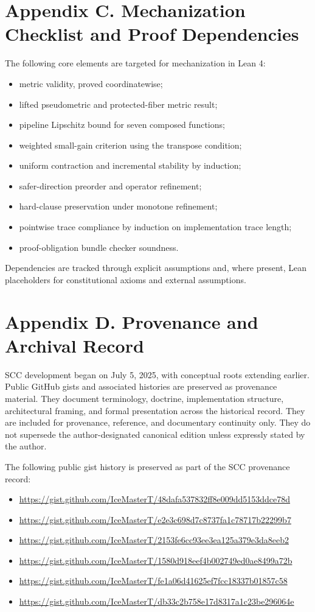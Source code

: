 \documentclass[10pt,oneside]{article}
\theoremstyle{definition}
\theoremstyle{remark}
\begin{document}
\section{Appendix C. Mechanization Checklist and Proof Dependencies}
The following core elements are targeted for mechanization in Lean 4:
\begin{itemize}
  \item metric validity, proved coordinatewise;
  \item lifted pseudometric and protected-fiber metric result;
  \item pipeline Lipschitz bound for seven composed functions;
  \item weighted small-gain criterion using the transpose condition;
  \item uniform contraction and incremental stability by induction;
  \item safer-direction preorder and operator refinement;
  \item hard-clause preservation under monotone refinement;
  \item pointwise trace compliance by induction on implementation trace length;
  \item proof-obligation bundle checker soundness.
\end{itemize}
Dependencies are tracked through explicit assumptions and, where present, Lean placeholders for constitutional axioms and external assumptions.

\section{Appendix D. Provenance and Archival Record}
SCC development began on July 5, 2025, with conceptual roots extending earlier. Public GitHub gists and associated histories are preserved as provenance material. They document terminology, doctrine, implementation structure, architectural framing, and formal presentation across the historical record. They are included for provenance, reference, and documentary continuity only. They do not supersede the author-designated canonical edition unless expressly stated by the author.

The following public gist history is preserved as part of the SCC provenance record:
\begin{itemize}
  \item \url{https://gist.github.com/IceMasterT/48dafa537832ff8e009dd5153ddce78d}
  \item \url{https://gist.github.com/IceMasterT/e2e3c698d7c8737fa1c78717b22299b7}
  \item \url{https://gist.github.com/IceMasterT/2153fe6cc93ee3ea125a379e3da8eeb2}
  \item \url{https://gist.github.com/IceMasterT/1580d918eef4b002749ed0ae8499a72b}
  \item \url{https://gist.github.com/IceMasterT/fe1a06d41625ef7fcc18337b01857c58}
  \item \url{https://gist.github.com/IceMasterT/db33c2b758e17d8317a1c23be296064e}
\end{itemize}
\end{document}
